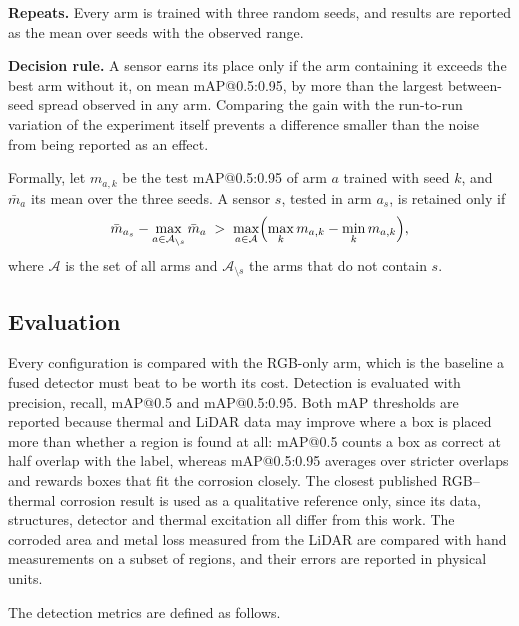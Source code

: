 \textbf{Repeats.} Every arm is trained with three random seeds, and results are
reported as the mean over seeds with the observed range.

\textbf{Decision rule.} A sensor earns its place only if the arm containing it
exceeds the best arm without it, on mean mAP@0.5:0.95, by more than the largest
between-seed spread observed in any arm. Comparing the gain with the run-to-run
variation of the experiment itself prevents a difference smaller than the noise
from being reported as an effect.

Formally, let $m_{a,k}$ be the test mAP@0.5:0.95 of arm $a$ trained with seed
$k$, and $\bar{m}_a$ its mean over the three seeds. A sensor $s$, tested in
arm $a_s$, is retained only if
\begin{equation}
\bar{m}_{a_s} - \max_{a \in \mathcal{A}_{\setminus s}} \bar{m}_a \;>\;
\max_{a \in \mathcal{A}} \Bigl( \max_k m_{a,k} - \min_k m_{a,k} \Bigr),
\label{eq:decision}
\end{equation}
where $\mathcal{A}$ is the set of all arms and $\mathcal{A}_{\setminus s}$ the
arms that do not contain $s$.

\subsection{Evaluation}
\label{sec:evaluation}

Every configuration is compared with the RGB-only arm, which is the baseline a
fused detector must beat to be worth its cost. Detection is evaluated with
precision, recall, mAP@0.5 and mAP@0.5:0.95. Both mAP thresholds are reported
because thermal and LiDAR data may improve where a box is placed more than
whether a region is found at all: mAP@0.5 counts a box as correct at half
overlap with the label, whereas mAP@0.5:0.95 averages over stricter overlaps and
rewards boxes that fit the corrosion closely.
The closest published RGB--thermal corrosion result \citep{Lim2021} is used as a
qualitative reference only, since its data, structures, detector and thermal
excitation all differ from this work. The corroded area and metal loss measured from the LiDAR are
compared with hand measurements on a subset of regions, and their errors are
reported in physical units.

The detection metrics are defined as follows.

